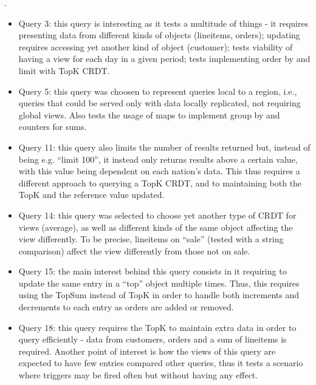 \documentclass{vldb}
\newcommand{\grumbler}[2]{{\color{red}{\bf #1:} #2}}
\renewcommand{\grumbler}[2]{}
\newcommand{\andre}[1]{\grumbler{andre}{#1}}
\begin{document}
\andre{I'm not sure I should keep the last phrase above}.

\begin{itemize}
	\item Query 3: this query is interesting as it tests a multitude of things - it requires presenting data from different kinds of objects (lineitems, orders); updating requires accessing yet another kind of object (customer); tests viability of having a view for each day in a given period; tests implementing order by and limit with TopK CRDT.
	\item Query 5: this query was choosen to represent queries local to a region, i.e., queries that could be served only with data locally replicated, not requiring global views.
	Also tests the usage of maps to implement group by and counters for sums.
	\item Query 11: this query also limits the number of results returned but, instead of being e.g. ``limit 100'', it instead only returns results above a certain value, with this value being dependent on each nation's data.
	This thus requires a different approach to querying a TopK CRDT, and to maintaining both the TopK and the reference value updated.
	\item Query 14: this query was selected to choose yet another type of CRDT for views (average), as well as different kinds of the same object affecting the view differently.
	To be precise, lineitems on ``sale'' (tested with a string comparison) affect the view differently from those not on sale.
	\item Query 15: the main interest behind this query consists in it requiring to update the same entry in a ``top'' object multiple times.
	Thus, this requires using the TopSum instead of TopK in order to handle both increments and decrements to each entry as orders are added or removed.
	\item Query 18: this query requires the TopK to maintain extra data in order to query efficiently - data from customers, orders and a sum of lineitems is required.
	Another point of interest is how the views of this query are expected to have few entries compared other queries, thus it tests a scenario where triggers may be fired often but without having any effect.
\end{itemize}
\end{document}
